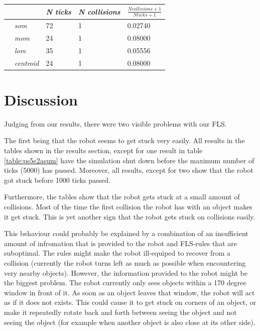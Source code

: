 \documentclass[conference]{IEEEtran}
\begin{document}
\begin{center}
\begin{tabular}{ | m{2.8em} | m{3em} | m{2.8em} | m{5em} | m{5.2em} | }
\hline
{} & \textit{N ticks} & \textit{N collisions} & $\frac{N collisions + 1}{N ticks + 1}$ \\
\hline
{} & \textit{som} & 72 & 1 & 0.02740 \\
 & \textit{mom} & 24 & 1 & 0.08000 \\
 & \textit{lom} & 35 & 1 & 0.05556 \\
 & \textit{centroid} & 24 & 1 & 0.08000 \\
\hline
\end{tabular}
\label{table:ps10e2asum}
\end{center}


\section{Discussion}
Judging from our results, there were two visible problems with our FLS.

The first being that the robot seems to get stuck very easily. All results in the tables shown in the results section, except for one result in table \ref{table:ps5e2asum} have the simulation shut down before the maximum number of ticks (5000) has passed. Moreover, all results, except for two show that the robot got stuck before 1000 ticks passed.

Furthermore, the tables show that the robot gets stuck at a small amount of collisions. Most of the time the first collision the robot has with an object makes it get stuck. This is yet another sign that the robot gets stuck on collisions easily.

This behaviour could probably be explained by a combination of an insufficient amount of infromation that is provided to the robot and FLS-rules that are suboptimal. The rules might make the robot ill-equiped to recover from a collision (currently the robot turns left as much as possible when encountering very nearby objects). However, the information provided to the robot might be the biggest problem. The robot currently only sees objects within a 170 degree window in front of it. As soon as an object leaves that window, the robot will act as if it does not exists. This could cause it to get stuck on corners of an object, or make it repeatedly rotate back and forth between seeing the object and not seeing the object (for example when another object is also close at its other side).
\end{document}
